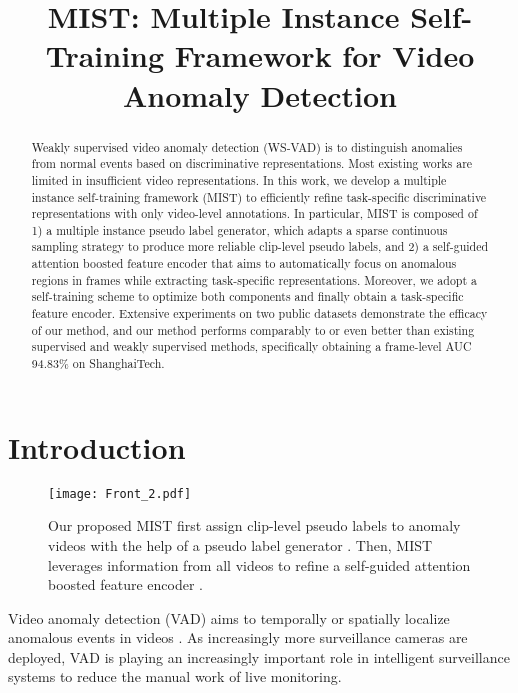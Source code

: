 \documentclass[final]{cvpr}
\newcommand{\ftst}{\textcolor[rgb]{0,0, 0}}
\newcommand{\jcst}{\textcolor[rgb]{0,0,0}}
\newcommand{\jcla}{\textcolor[rgb]{0.,0.,0}}
\newcommand{\jcca}{\textcolor[rgb]{0,0,0}}
\begin{document}
\title{\jcst{MIST: Multiple Instance Self-Training Framework for Video Anomaly Detection}}

\maketitle

\begin{abstract}


Weakly supervised video anomaly detection (WS-VAD) is to distinguish anomalies from normal events based on discriminative representations. Most existing works are limited in insufficient video representations.
In this work, we develop a multiple instance self-training framework (MIST) to efficiently refine task-specific discriminative representations with only video-level annotations.
In particular, MIST is composed of 1) a multiple instance pseudo label generator, which adapts a sparse continuous sampling strategy to produce more reliable clip-level pseudo labels,
and 2) a self-guided attention boosted feature encoder that aims to automatically focus on anomalous regions in frames while extracting task-specific representations. 
\ftst{Moreover, we adopt a self-training scheme to optimize both components and finally obtain a task-specific feature encoder}.
Extensive experiments on two public datasets demonstrate the efficacy of our method, and our method 
\jcca{performs comparably to or even better than existing supervised and weakly supervised methods, specifically obtaining a frame-level AUC 94.83\% on ShanghaiTech.}\end{abstract}

\section{Introduction}
\label{ses:intro}

\begin{figure}
    \centering
    \texttt{[image: Front\_2.pdf]}
    \caption{\jcla{Our proposed MIST first assign clip-level pseudo labels  to anomaly videos with the help of a pseudo label generator . Then, MIST leverages information from all videos to refine a self-guided attention boosted feature encoder .}}
    \label{fig:Front_Update}
\end{figure}

Video anomaly detection (VAD) aims to temporally or spatially localize anomalous events in videos \cite{zhu2020video}. As \jcca{increasingly} more surveillance cameras are deployed, VAD is playing an increasingly important role in intelligent surveillance systems to reduce the manual work of live monitoring.
\end{document}
